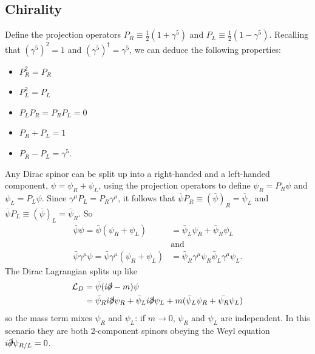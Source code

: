 \documentclass[a4paper,12pt]{article}
\begin{document}
\subsection{Chirality}
%
Define the projection operators $P_R \equiv \frac{1}{2}(1 + \gamma^5)$ and $P_L \equiv \frac{1}{2}(1 - \gamma^5)$. Recalling that $(\gamma^5)^2 = 1$ and $(\gamma^5)^\dagger = \gamma^5$, we can deduce the following properties:
\begin{itemize}
    \item $P_R^2 = P_R$
    \item $P_L^2 = P_L$
    \item $P_LP_R = P_RP_L = 0$
    \item $P_R + P_L = 1$
    \item $P_R - P_L = \gamma^5$.
\end{itemize}
% 
Any Dirac spinor can be split up into a right-handed and a left-handed component, $\psi = \psi_R + \psi_L$, using the projection operators to define $\psi_R = P_R \psi$ and $\psi_L = P_L \psi$. Since $\gamma^\mu P_L = P_R \gamma^\mu$, it follows that $\bar{\psi} P_R \equiv (\bar{\psi})_R = \bar{\psi}_L$ and $\bar{\psi} P_L \equiv (\bar{\psi})_L = \bar{\psi}_R$. So 
\begin{equation}
\begin{split}
    \bar{\psi}\psi = \bar{\psi}(\psi_R + \psi_L) &= \bar{\psi}_L\psi_R + \bar{\psi}_R\psi_L \\
    &\text{and} \\
    \bar{\psi}\gamma^\mu \psi = \bar{\psi}\gamma^\mu(\psi_R + \psi_L) &= \bar{\psi}_R\gamma^\mu\psi_R 
    \bar{\psi}_L\gamma^\mu\psi_L.
\end{split}
\end{equation}
%
The Dirac Lagrangian splits up like 
\begin{equation}
\begin{split}
\mathcal{L}_D &= \bar{\psi}(i\slashed{\partial}-m)\psi \\ 
&= \bar{\psi}_R i\slashed{\partial}\psi_R + \bar{\psi}_L i\slashed{\partial}\psi_L
+ m(\bar{\psi}_L\psi_R + \bar{\psi_R}\psi_L)
\end{split}
\end{equation}
so the mass term mixes $\psi_R$ and $\psi_L$: if $m \to 0$, $\psi_R$ and $\psi_L$ are independent. In this scenario they are both 2-component spinors obeying the Weyl equation $i\slashed{\partial}\psi_{R/L} = 0$.
\end{document}
